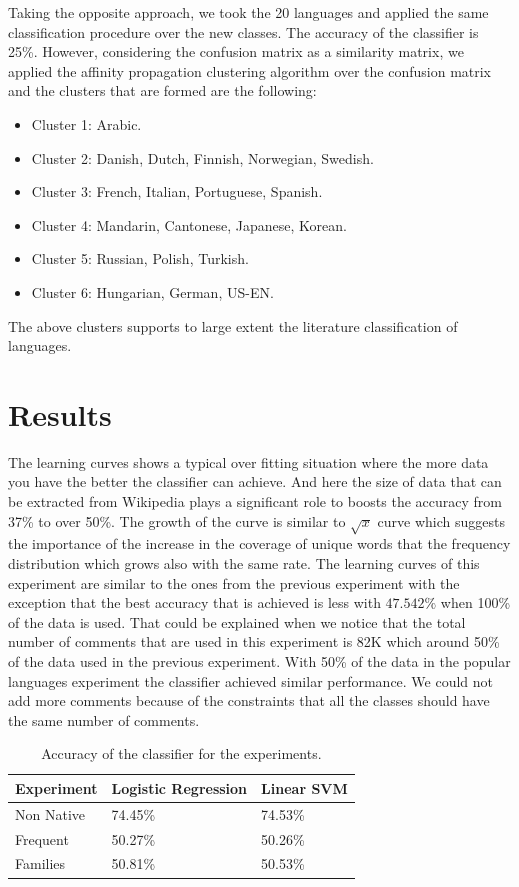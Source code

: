 \documentclass[11pt]{article}
\begin{document}
Taking the opposite approach, we took the 20 languages and applied the same classification procedure over the new classes. The accuracy of the classifier is 25\%. However, considering the confusion matrix as a similarity matrix, we applied the affinity propagation clustering algorithm over the confusion matrix and the clusters that are formed are the following:
\begin{itemize}
\item Cluster 1: Arabic.
\item Cluster 2: Danish, Dutch, Finnish, Norwegian, Swedish.
\item Cluster 3: French, Italian, Portuguese, Spanish.
\item Cluster 4: Mandarin, Cantonese, Japanese, Korean.
\item Cluster 5: Russian, Polish, Turkish.
\item Cluster 6: Hungarian, German, US-EN.
\end{itemize}

The above clusters supports to large extent the literature classification of languages.

\section{Results}

The learning curves shows a typical over fitting situation where the more data you have the better the classifier can achieve. And here the size of data that can be extracted from Wikipedia plays a significant role to boosts the accuracy from 37\% to over 50\%. The growth of the curve is similar to $\sqrt{x}$ curve which suggests the importance of the increase in the coverage of unique words that the frequency distribution which grows also with the same rate.
The learning curves of this experiment are similar to the ones from the previous experiment with the exception that the best accuracy that is achieved is less with $47.542\%$ when 100\% of the data is used. That could be explained when we notice that the total number of comments that are used in this experiment is 82K which around 50\% of the data used in the previous experiment. With 50\% of the data in the popular languages experiment the classifier achieved similar performance. We could not add more comments because of the constraints that all the classes should have the same number of comments.
\begin{table}[htp]
\begin{tabular}{l|ll}
	Experiment & Logistic Regression & Linear SVM
	\\\hline
	Non Native & 74.45\% & 74.53\%\\
	Frequent & 50.27\% & 50.26\%\\
	Families & 50.81\% &50.53\% \\
\end{tabular}
\caption{Accuracy of the classifier for the experiments.}
\label{table:results}
\end{table}
\end{document}
